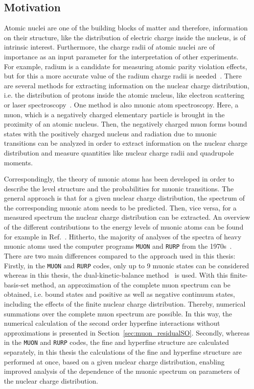 \subsection{Motivation}
\label{sec:muon_motivation}
Atomic nuclei are one of the building blocks of matter and therefore, information on their structure, like the distribution of electric charge inside the nucleus, is of intrinsic interest. Furthermore, the charge radii of atomic nuclei are of importance as an input parameter for the interpretation of other experiments. For example, radium is a candidate for measuring atomic parity violation effects, but for this a more accurate value of the radium charge radii is needed~\cite{wansbeek2012}.
There are several methods for extracting information on the nuclear charge distribution, i.e. the distribution of protons inside the atomic nucleus, like electron scattering~\cite{devries1987} or laser spectroscopy~\cite{wang2004,dewitte2007,mueller2007}. One method is also muonic atom spectroscopy. Here, a muon, which is a negatively charged elementary particle is brought in the proximity of an atomic nucleus. Then, the negatively charged muon forms bound states with the positively charged nucleus and radiation due to muonic transitions can be analyzed in order to extract information on the nuclear charge distribution and measure quantities like nuclear charge radii and quadrupole moments.

Correspondingly, the theory of muonic atoms has been developed in order to describe the level structure and the probabilities for muonic transitions. The general approach is that for a given nuclear charge distribution, the spectrum of the corresponding muonic atom needs to be predicted. Then, vice versa, for a measured spectrum the nuclear charge distribution can be extracted. An overview of the different contributions to the energy levels of muonic atoms can be found for example in Ref.~\cite{BorieRinker1982}. Hitherto, the majority of analyses of the spectra of heavy muonic atoms used the computer programs \texttt{MUON} and \texttt{RURP} from the 1970s~\cite{rinker1979}. There are two main differences compared to the approach used in this thesis:
Firstly, in the \texttt{MUON} and \texttt{RURP} codes, only up to 9 muonic states can be considered whereas in this thesis, the dual-kinetic-balance method~\cite{Shabaev2004} is used. With this finite-basis-set method, an approximation of the complete muon spectrum can be obtained, i.e. bound states and positive as well as negative continuum states, including the effects of the finite nuclear charge distribution. Thereby, numerical summations over the complete muon spectrum are possible. In this way, the numerical calculation of the second order hyperfine interactions without approximations is presented in Section~\ref{sec:muon_residualSO}.
Secondly, whereas in the \texttt{MUON} and \texttt{RURP} codes, the fine and hyperfine structure are calculated separately, in this thesis the calculations of the fine and hyperfine structure are performed at once, based on a given nuclear charge distribution, enabling improved analysis of the dependence of the muonic spectrum on parameters of the nuclear charge distribution.

